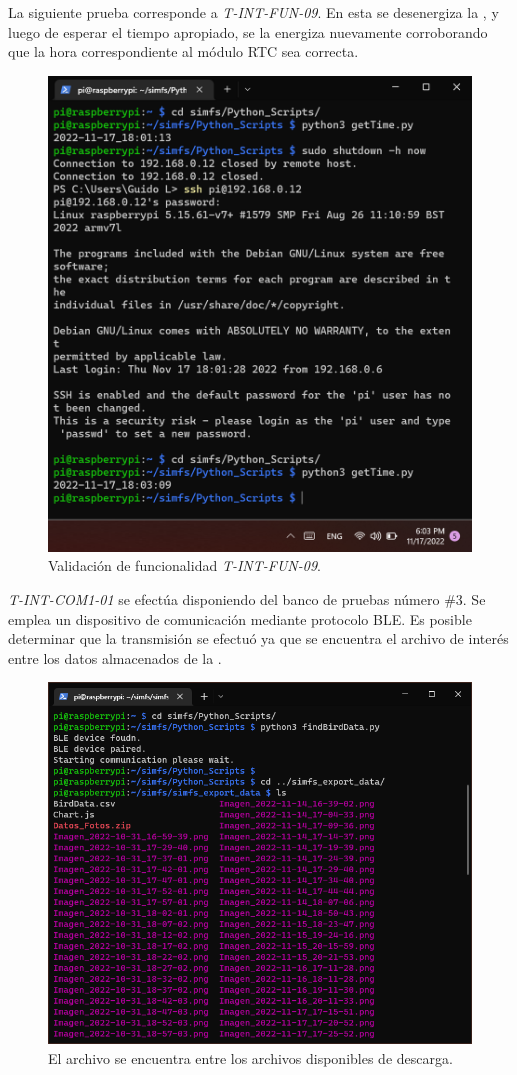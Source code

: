 La siguiente prueba corresponde a \textit{T-INT-FUN-09}. En esta se desenergiza la \rspi, y luego de esperar el tiempo apropiado, se la energiza nuevamente corroborando que la hora correspondiente al módulo RTC sea correcta.
\begin{figure}[H]
	\centering
	\includegraphics[width=0.8\linewidth]{ImagenesValidacion del prototipo/TINTFUN9}
	\caption{Validación de funcionalidad \textit{T-INT-FUN-09}.}
\end{figure}

\textit{T-INT-COM1-01} se efectúa disponiendo del banco de pruebas número \#3. Se emplea un dispositivo de comunicación mediante protocolo BLE. Es posible determinar que la transmisión se efectuó ya que se encuentra el archivo de interés entre los datos almacenados de la \rpi.
\begin{figure}[H]
	\centering
	\includegraphics[width=0.8\linewidth]{ImagenesValidacion del prototipo/BirdData2}
	\caption{El archivo  se encuentra entre los archivos disponibles de descarga.}
\end{figure}

